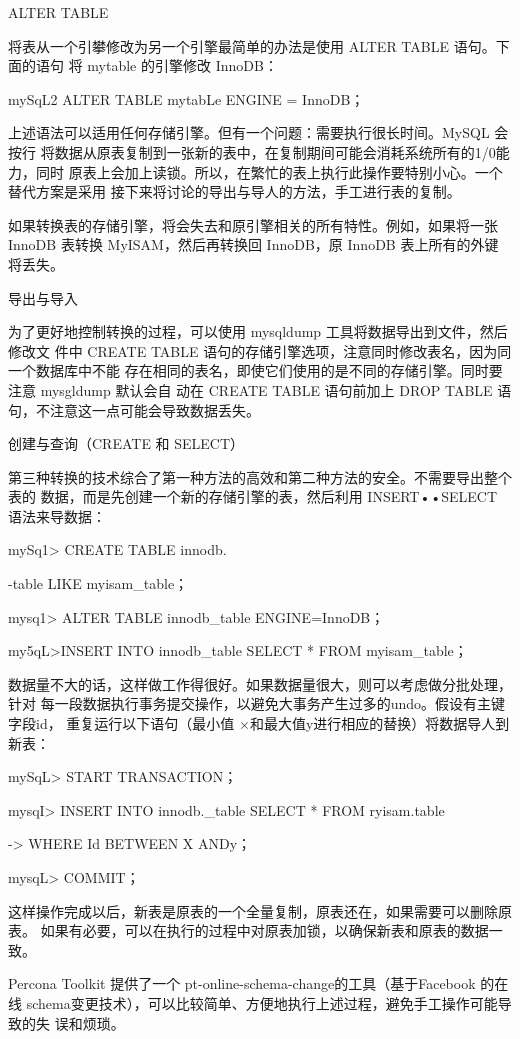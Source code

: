 ALTER TABLE

将表从一个引攀修改为另一个引擎最简单的办法是使用 ALTER TABLE 语句。下面的语句
将 mytable 的引擎修改 InnoDB：

mySqL2 ALTER TABLE mytabLe ENGINE = InnoDB；

上述语法可以适用任何存储引擎。但有一个问题：需要执行很长时间。MySQL 会按行
将数据从原表复制到一张新的表中，在复制期间可能会消耗系统所有的1/0能力，同时
原表上会加上读锁。所以，在繁忙的表上执行此操作要特别小心。一个替代方案是采用
接下来将讨论的导出与导人的方法，手工进行表的复制。

如果转换表的存储引擎，将会失去和原引擎相关的所有特性。例如，如果将一张 InnoDB
表转换 MyISAM，然后再转换回 InnoDB，原 InnoDB 表上所有的外键将丢失。

导出与导入

为了更好地控制转换的过程，可以使用 mysqldump 工具将数据导出到文件，然后修改文
件中 CREATE TABLE 语句的存储引擎选项，注意同时修改表名，因为同一个数据库中不能
存在相同的表名，即使它们使用的是不同的存储引擎。同时要注意 mysgldump 默认会自
动在 CREATE TABLE 语句前加上 DROP TABLE 语句，不注意这一点可能会导致数据丢失。

创建与查询（CREATE 和 SELECT）

第三种转换的技术综合了第一种方法的高效和第二种方法的安全。不需要导出整个表的
数据，而是先创建一个新的存储引擎的表，然后利用 INSERT••SELECT 语法来导数据：

mySq1> CREATE TABLE innodb.

-table LIKE myisam\_table；

mysq1> ALTER TABLE innodb\_table ENGINE=InnoDB；

my5qL>INSERT INTO innodb\_table SELECT * FROM myisam\_table；

数据量不大的话，这样做工作得很好。如果数据量很大，则可以考虑做分批处理，针对
每一段数据执行事务提交操作，以避免大事务产生过多的undo。假设有主键字段id，
重复运行以下语句（最小值 ×和最大值y进行相应的替换）将数据导人到新表：

mySqL> START TRANSACTION；

mysqI> INSERT INTO innodb.\_table SELECT * FROM ryisam.table

-> WHERE Id BETWEEN X ANDy；

mysqL> COMMIT；

这样操作完成以后，新表是原表的一个全量复制，原表还在，如果需要可以删除原表。
如果有必要，可以在执行的过程中对原表加锁，以确保新表和原表的数据一致。

Percona Toolkit 提供了一个 pt-online-schema-change的工具（基于Facebook 的在线
schema变更技术），可以比较简单、方便地执行上述过程，避免手工操作可能导致的失
误和烦琐。

